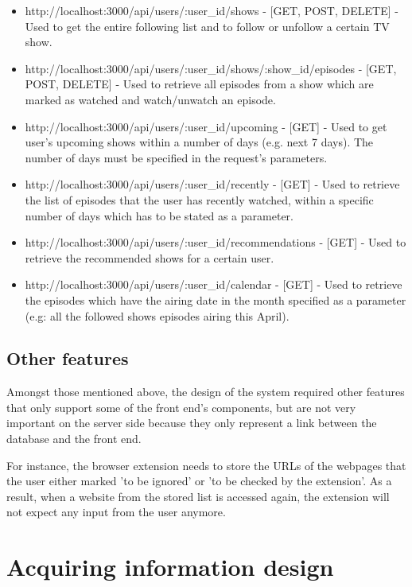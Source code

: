 \begin{itemize}
    \item http://localhost:3000/api/users/:user\_id/shows - [GET, POST, DELETE] - Used to get the entire following list and to follow or unfollow a certain TV show.
    \item http://localhost:3000/api/users/:user\_id/shows/:show\_id/episodes - [GET, POST, DELETE] - Used to retrieve all episodes from a show which are marked as watched and watch/unwatch an episode.
    \item http://localhost:3000/api/users/:user\_id/upcoming - [GET] - Used to get user's upcoming shows within a number of days (e.g. next 7 days). The number of days must be specified in the request's parameters.
    \item http://localhost:3000/api/users/:user\_id/recently - [GET] - Used to retrieve the list of episodes that the user has recently watched, within a specific number of days which has to be stated as a parameter.
    \item http://localhost:3000/api/users/:user\_id/recommendations - [GET] - Used to retrieve the recommended shows for a certain user.
    \item http://localhost:3000/api/users/:user\_id/calendar - [GET] - Used to retrieve the episodes which have the airing date in the month specified as a parameter (e.g: all the followed shows episodes airing this April).
\end{itemize}

\subsection{Other features}

Amongst those mentioned above, the design of the system required other features that only support some of the front end's components, but are not very important on the server side because they only represent a link between the database and the front end.

For instance, the browser extension needs to store the URLs of the webpages that the user either marked 'to be ignored' or 'to be checked by the extension'. As a result, when a website from the stored list is accessed again, the extension will not expect any input from the user anymore.

\section{Acquiring information design}

